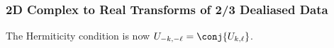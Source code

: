 \documentclass[final]{siamltex}
\def\ee{\end{dmath*}}
\def\bec{\begin{dmath*}[compact]}
\def\no{\hiderel}
\begin{document}
\subsubsection{2D Complex to Real Transforms of 2/3 Dealiased Data}
The Hermiticity condition is now $U_{-k,-\ell}=\conj{U_{k,\ell}}$.

\end{document}
